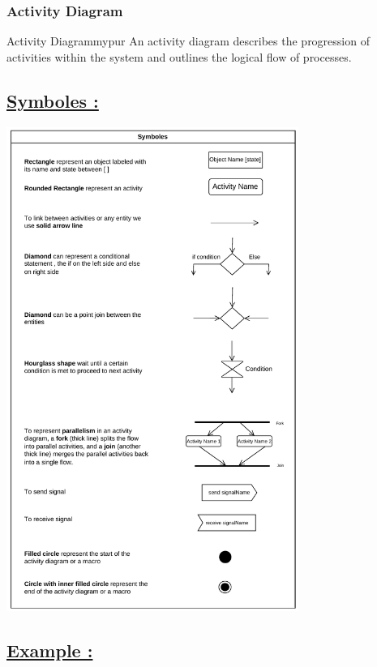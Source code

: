 \vspace{1cm}
\subsubsection{Activity Diagram}

\begin{prettyBox}{Activity Diagram}{mypur}
An activity diagram describes the progression of activities within the system and outlines the logical flow of processes.
\end{prettyBox}

\subsection*{\underline{Symboles :}}

\begin{center}
\includegraphics[width=0.715\textwidth,height=0.9\textheight]{Chapters/Diagram/AC/sym.drawio.pdf}
\end{center}


\subsection*{\underline{Example :}}

